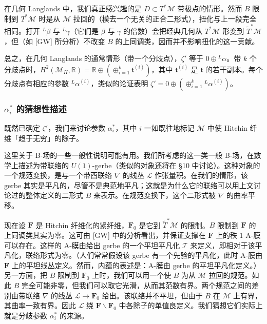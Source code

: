 在几何 Langlands 中，我们真正感兴趣的是 $D\subset T^*\mathcal{M}$ 带极点的情形。然而 $B$ 限制到 $T^*\mathcal{M}$ 时是从 $\mathcal{M}$ 拉回的（模去一个无关的正合二形式），扭化与上一段完全相同。打开 ${}^L\beta$ 与 ${}^L\gamma$（它们是 $\beta$ 与 $\gamma$ 的倍数）会把经典几何从 $T^*\mathcal{M}$ 形变到 $\widetilde{T}^*\mathcal{M}$，但（如 [GW] 所分析）不改变 $B$ 的上同调类，因而并不影响扭化的这一贡献。


总之，在几何 Langlands 的通常情形（带一个分歧点），$\zeta'$ 等于 $0\oplus{}^L\alpha$。带 $k$ 个分歧点时，$H^2(\mathcal{M}_H,\mathbb{R})=\mathbb{R}\oplus(\oplus_{i=1}^{k}\mathfrak{t}^{(i)})$，其中 $\mathfrak{t}^{(i)}$ 是 $\mathfrak{t}$ 的若干副本。每个分歧点有相应的参数 ${}^L\alpha^{(i)}$，类似的论证表明 $\zeta'=0\oplus(\oplus_{i=1}^{k}{}^L\alpha^{(i)})$。

\subsubsection{\texorpdfstring{$\alpha_i^*$}{αi*} 的猜想性描述}

既然已确定 $\zeta'$，我们来讨论参数 $\alpha_i^*$，其中 $i$ 一如既往地标记 $\mathcal{M}$ 中使 Hitchin 纤维「趋于无穷」的除子。

这里关于 B-场的一些一般性说明可能有用。我们所考虑的这一类一般 B-场，在数学上描述为带联络的 $U(1)$-gerbe（类似的对象还将在 §10 中讨论）。这种对象的一个规范变换，是与一个带酉联络 $\nabla$ 的线丛 $\mathcal{L}$ 作张量积。在我们的情形，该 gerbe 其实是平凡的，尽管不是典范地平凡；这就是为什么它的联络可以用上文讨论过的整体定义的二形式 $B$ 来表示。在规范变换下，这个二形式被 $\nabla$ 的曲率平移。

现在设 $\boldsymbol{F}$ 是 Hitchin 纤维化的紧纤维，$\boldsymbol{F}_0$ 是它到 $\widetilde{T}^*\mathcal{M}$ 的限制。$B$ 限制到 $\boldsymbol{F}$ 的上同调类其实为零。这可由 [GW] 中的分析看出，并保证支撑在 $\boldsymbol{F}$ 上的秩 1 A-膜可以存在。这样的 A-膜由给出 gerbe 的一个平坦平凡化 $\mathcal{T}$ 来定义，即相对于该平凡化，联络形式为零。（人们常常假设该 gerbe 有一个先验的平凡化，此时 A-膜由 $\boldsymbol{F}$ 上的平坦线丛定义。然而，内蕴的表述是：A-膜由 gerbe 的平坦平凡化定义。）另一方面，把 $B$ 限制到 $\boldsymbol{F}_0$ 上时，我们可以用一个使 $B$ 为从 $\mathcal{M}$ 拉回的规范。如此 $B$ 完全可能非零，但我们可以取它光滑，从而其范数有界。两个规范之间的差别由带联络 $\nabla$ 的线丛 $\mathcal{L}\to\boldsymbol{F}_0$ 给出。该联络并不平坦，但由于 $B$ 在 $\mathcal{M}$ 上有界，其曲率一致有界。因此 $\mathcal{L}$ 绕 $\boldsymbol{F}\backslash\boldsymbol{F}_0$ 中各除子的单值良定义。我们猜想它们实际上就是分歧参数 $\alpha_i^*$ 的来源。

